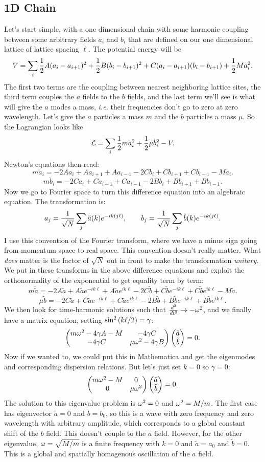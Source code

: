 \documentclass[12pt]{article}
\begin{document}
\subsection{1D Chain}
Let's start simple, with a one dimensional chain with some harmonic coupling between some arbitrary fields $a_i$ and $b_i$ that are defined on our one dimensional lattice of lattice spacing $\ell$. The potential energy will be
\[ V = \sum_i \frac{1}{2}A (a_i-a_{i+1})^2 + \frac{1}{2} B(b_i - b_{i+1})^2 + C(a_i-a_{i+1})(b_i - b_{i+1}) + \frac{1}{2} M a_i^2.\]
The first two terms are the coupling between nearest neighboring lattice sites, the third term couples the $a$ fields to the $b$ fields, and the last term we'll see is what will give the $a$ modes a mass, \emph{i.e.} their frequencies don't go to zero at zero wavelength. Let's give the $a$ particles a mass $m$ and the $b$ particles a mass $\mu$. So the Lagrangian looks like
\[ \mathcal{L} = \sum_i \frac{1}{2}m \dot{a}_i^2 + \frac{1}{2}\mu \dot{b}_i^2 - V.\]
Newton's equations then read:
\[ m\ddot{a}_i = -2Aa_i + Aa_{i+1} +Aa_{i-1} - 2Cb_i +Cb_{i+1} + Cb_{i-1} - Ma_i.\]
\[ m\ddot{b}_i = -2Ca_i + Ca_{i+1} +Ca_{i-1} - 2Bb_i +Bb_{i+1} + Bb_{i-1}.\]
Now we go to Fourier space to turn this difference equation into an algebraic equation. The transformation is:
\[ a_j = \frac{1}{\sqrt{N}}\sum_j \tilde{a}(k) e^{-i k(j\ell)},\qquad b_j = \frac{1}{\sqrt{N}}\sum_j \tilde{b}(k) e^{-ik(j\ell)}.\]
I use this convention of the Fourier transform, where we have a minus sign going from momentum space to real space. This convention doesn't really matter. What \emph{does} matter is the factor of $\sqrt{N}$ out in front to make the transformation \emph{unitary}. We put in these transforms in the above difference equations and exploit the orthonormality of the exponential to get equality term by term:
\[ m\ddot{\tilde{a}} = -2A\tilde{a} + A\tilde{a}e^{-ik\ell} + A\tilde{a}e^{ik\ell} - 2C \tilde{b} + C \tilde b e^{-ik\ell} + C\tilde b e^{i k \ell} - M\tilde a.\]
\[ \mu\ddot{\tilde{b}} = -2C\tilde{a} + C\tilde{a}e^{-ik\ell} + C\tilde{a}e^{ik\ell} - 2B \tilde{b} + B \tilde b e^{-ik\ell} + B\tilde b e^{i k \ell}.\]
We then look for time-harmonic solutions such that $\frac{d {^2}}{d {t^2}}\rightarrow -\omega^2$, 
and we finally have a matrix equation, setting $\sin^2\left(k\ell/2\right) = \gamma$:
\[ \left(\begin{matrix}m\omega^2 - 4\gamma A - M & -4\gamma C \\ - 4\gamma C & \mu \omega^2 - 4\gamma B\end{matrix}\right) 
\left(\begin{matrix}\tilde a \\ \tilde b\end{matrix}\right) = 0.\]
Now if we wanted to, we could put this in Mathematica and get the eigenmodes and corresponding dispersion relations. But let's just set $k=0$ so $\gamma = 0$:
\[ \left(\begin{matrix}m\omega^2 - M & 0 \\ 0 & \mu \omega^2\end{matrix}\right)\left(\begin{matrix}\tilde a \\ \tilde b\end{matrix}\right) = 0.\]
The solution to this eigenvalue problem is $\omega^2 = 0$ and $\omega^2 = M/m$. The first case has eigenvector $\tilde a = 0$ and $\tilde b = b_0$, so this is a wave with zero frequency and zero wavelength with arbitrary amplitude, which corresponds to a global constant shift of the $b$ field. This doesn't couple to the $a$ field. However, for the other eigenvalue, $\omega = \sqrt{M/m}$ is a finite frequency with $k=0$ and $\tilde a = a_0$ and $\tilde b = 0$. This is a global and spatially homogenous oscillation of the $a$ field.
\end{document}
